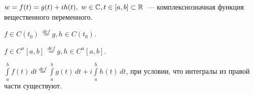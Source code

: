 \(w = f(t) = g(t) + ih(t), \ w \in \mathbb{C}, t \in [a, b] \subset \mathbb{R}\)~--- комплекснозначная функция
вещественного переменного.

\begin{definition}
\(f \in C(t_0) \ \overset{def}{=} g, h \in C(t_0)\).
\end{definition}

\begin{definition}
\(f \in C^n[a, b] \ \overset{def}{=} g, h \in C^n[a, b]\).
\end{definition}

\begin{definition}
\(\int\limits_{a}^{b} f(t) \,dt \overset{def}{=} \int\limits_{a}^{b} g(t) \,dt + i\int\limits_{a}^
{b} h(t) \,dt\), при условии, что интегралы из правой части существуют.
\end{definition}